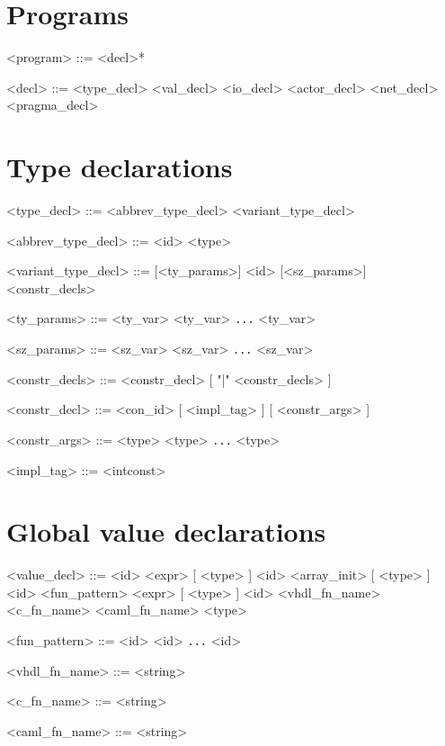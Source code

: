 \setlength{\grammarindent}{6em} %
\renewcommand{\litleft}{\texttt{"}}
\renewcommand{\litright}{\texttt{"}}

\section*{Programs}

\begin{grammar}
<program> ::= <decl>*

<decl> ::= <type_decl> \lit{;}
          \alt <val_decl> \lit{;}
          \alt <io_decl> \lit{;}
          \alt <actor_decl> \lit{;}
          \alt <net_decl> \lit{;}
          \alt <pragma_decl>
\end{grammar}

\section*{Type declarations}

\begin{grammar}
<type_decl> ::= <abbrev_type_decl>
              \alt <variant_type_decl>

<abbrev_type_decl> ::=  <id> \lit{==} <type>

<variant_type_decl> ::=  [<ty_params>] <id> [<sz_params>] \lit{=} <constr_decls>

<ty_params> ::= <ty_var> 
              \alt \lit{(} <ty_var> \lit{,} \texttt{...} \lit{,} <ty_var> \lit{)}

<sz_params> ::= \lit{\verb|<|} <sz_var> \lit{\verb|>|}
              \alt \lit{\verb|<|} <sz_var> \lit{,} \texttt{...} \lit{,} <sz_var> \lit{\verb|>|}

<constr_decls> ::= <constr_decl> [ "|" <constr_decls> ]

<constr_decl> ::= <con_id> [ <impl_tag> ] [  <constr_args> ]

<constr_args> ::= <type>
             \alt <type> \lit{*} \texttt{...} \lit{*} <type>

<impl_tag> ::= \lit{\%} <intconst>
\end{grammar}

\section*{Global  value declarations}

\begin{grammar}
<value_decl> ::=  <id> \lit{=} <expr> [ \lit{:} <type> ]
               \alt {} <id> \lit{=} <array_init> [ \lit{:} <type> ]
                \alt {} <id> <fun_pattern> \lit{=} <expr> [ \lit{:} <type> ]
                \alt {} <id> \lit{=} 
                   <vhdl_fn_name> \lit{,} <c_fn_name> \lit{,} <caml_fn_name> \lit{:} <type>

<fun_pattern> ::= <id>
                \alt \lit{(} <id> \lit{,} \texttt{...} \lit{,} <id> \lit{)}

<vhdl_fn_name> ::= <string>

<c_fn_name> ::= <string>

<caml_fn_name> ::= <string>
\end{grammar}

